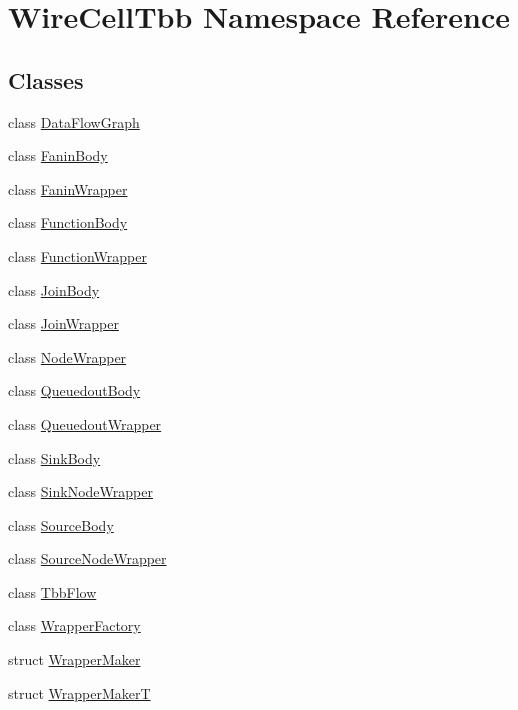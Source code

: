 \hypertarget{namespace_wire_cell_tbb}{}\section{Wire\+Cell\+Tbb Namespace Reference}
\label{namespace_wire_cell_tbb}
\subsection*{Classes}
\begin{DoxyCompactItemize}
\item 
class \hyperlink{class_wire_cell_tbb_1_1_data_flow_graph}{Data\+Flow\+Graph}
\item 
class \hyperlink{class_wire_cell_tbb_1_1_fanin_body}{Fanin\+Body}
\item 
class \hyperlink{class_wire_cell_tbb_1_1_fanin_wrapper}{Fanin\+Wrapper}
\item 
class \hyperlink{class_wire_cell_tbb_1_1_function_body}{Function\+Body}
\item 
class \hyperlink{class_wire_cell_tbb_1_1_function_wrapper}{Function\+Wrapper}
\item 
class \hyperlink{class_wire_cell_tbb_1_1_join_body}{Join\+Body}
\item 
class \hyperlink{class_wire_cell_tbb_1_1_join_wrapper}{Join\+Wrapper}
\item 
class \hyperlink{class_wire_cell_tbb_1_1_node_wrapper}{Node\+Wrapper}
\item 
class \hyperlink{class_wire_cell_tbb_1_1_queuedout_body}{Queuedout\+Body}
\item 
class \hyperlink{class_wire_cell_tbb_1_1_queuedout_wrapper}{Queuedout\+Wrapper}
\item 
class \hyperlink{class_wire_cell_tbb_1_1_sink_body}{Sink\+Body}
\item 
class \hyperlink{class_wire_cell_tbb_1_1_sink_node_wrapper}{Sink\+Node\+Wrapper}
\item 
class \hyperlink{class_wire_cell_tbb_1_1_source_body}{Source\+Body}
\item 
class \hyperlink{class_wire_cell_tbb_1_1_source_node_wrapper}{Source\+Node\+Wrapper}
\item 
class \hyperlink{class_wire_cell_tbb_1_1_tbb_flow}{Tbb\+Flow}
\item 
class \hyperlink{class_wire_cell_tbb_1_1_wrapper_factory}{Wrapper\+Factory}
\item 
struct \hyperlink{struct_wire_cell_tbb_1_1_wrapper_maker}{Wrapper\+Maker}
\item 
struct \hyperlink{struct_wire_cell_tbb_1_1_wrapper_maker_t}{Wrapper\+MakerT}
\end{DoxyCompactItemize}
